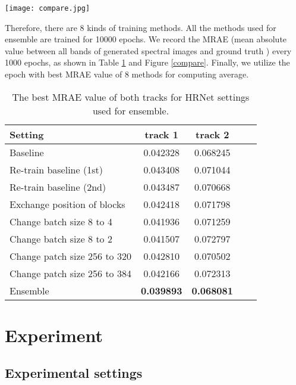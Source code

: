 \documentclass[10pt,twocolumn,letterpaper]{article}
\begin{document}
\begin{figure*}[htbp]
\centering
\texttt{[image: compare.jpg]}
\caption{The MRAE between ground truth spectral images and the generated images of different hyper-parameter settings for ensemble.}
\label{compare}
\end{figure*}

Therefore, there are 8 kinds of training methods. All the methods used for ensemble are trained for 10000 epochs. We record the MRAE (mean absolute value between all bands of generated spectral images  and ground truth ) every 1000 epochs, as shown in Table \ref{compare_table} and Figure \ref{compare}. Finally, we utilize the epoch with best MRAE value of 8 methods for computing average.

\begin{table}[t]
\begin{center}
\begin{tabular}{lcccc}
\hline
Setting & track 1 & track 2 \\
\hline
\hline
Baseline & 0.042328 & 0.068245 \\
Re-train baseline (1st) & 0.043408 & 0.071044 \\
Re-train baseline (2nd) & 0.043487 & 0.070668 \\
Exchange position of blocks & 0.042418 & 0.071798 \\
Change batch size 8 to 4 & 0.041936 & 0.071259 \\
Change batch size 8 to 2 & 0.041507 & 0.072797 \\
Change patch size 256 to 320 & 0.042810 & 0.070502 \\
Change patch size 256 to 384 & 0.042166 & 0.072313 \\
\hline
\hline
Ensemble & \textbf{0.039893} & \textbf{0.068081} \\
\hline
\end{tabular}
\end{center}
\caption{The best MRAE value of both tracks for HRNet settings used for ensemble.}
\label{compare_table}
\end{table}

\section{Experiment}

\subsection{Experimental settings}
\end{document}

